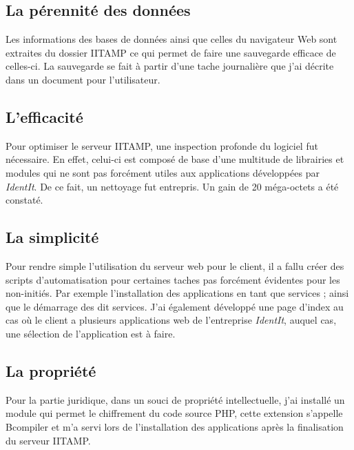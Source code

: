 \subsection{La pérennité des données} %
\label{sub:La pérennité des données}

Les informations des bases de données ainsi que celles du navigateur Web
sont extraites du dossier IITAMP ce qui permet de faire une sauvegarde
efficace de celles-ci. La sauvegarde se fait à partir d'une tache
journalière que j'ai décrite dans un document pour l'utilisateur.

\subsection{L'efficacité} %
\label{sub:L'efficacité}

Pour optimiser le serveur IITAMP, une inspection profonde du logiciel
fut nécessaire. En effet, celui-ci est composé de base d'une multitude
de librairies et modules qui ne sont pas forcément utiles aux
applications développées par \emph{IdentIt}. De ce fait, un nettoyage
fut entrepris. Un gain de 20 méga-octets a été constaté.

\subsection{La simplicité} %
\label{sub:La simplicité}

Pour rendre simple l'utilisation du serveur web pour le client, il a
fallu créer des scripts d'automatisation pour certaines taches pas
forcément évidentes pour les non-initiés. Par exemple l'installation des
applications en tant que services ; ainsi que le démarrage des dit
services.  J'ai également développé une page d'index au cas où le client
a plusieurs applications web de l'entreprise \emph{IdentIt}, auquel cas,
une sélection de l'application est à faire.

\subsection{La propriété} %
\label{sub:La propriété}

Pour la partie juridique, dans un souci de propriété intellectuelle,
j'ai installé un module qui permet le chiffrement du code source PHP,
cette extension s'appelle Bcompiler et m'a servi lors de l'installation
des applications après la finalisation du serveur IITAMP.

